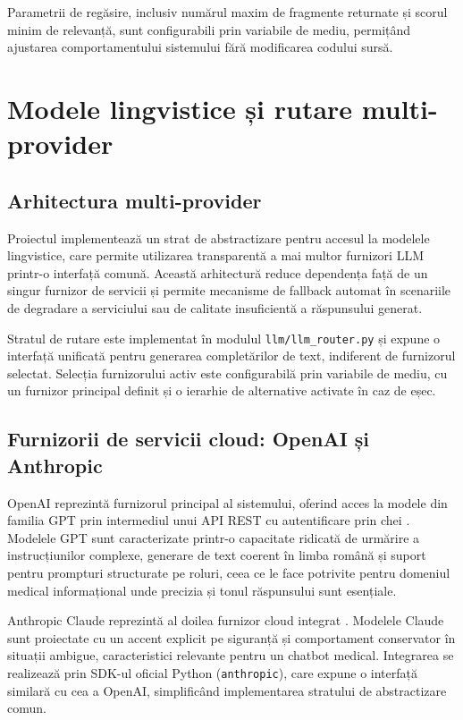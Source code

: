 \documentclass[12pt, a4paper, oneside, romanian]{teza-upb}
\begin{document}
Parametrii de regăsire, inclusiv numărul maxim de fragmente returnate și scorul minim de relevanță, sunt configurabili prin variabile de mediu, permițând ajustarea comportamentului sistemului fără modificarea codului sursă.

\section{Modele lingvistice și rutare multi-provider}

\subsection{Arhitectura multi-provider}

Proiectul implementează un strat de abstractizare pentru accesul la modelele lingvistice, care permite utilizarea transparentă a mai multor furnizori LLM printr-o interfață comună. Această arhitectură reduce dependența față de un singur furnizor de servicii și permite mecanisme de fallback automat în scenariile de degradare a serviciului sau de calitate insuficientă a răspunsului generat.

Stratul de rutare este implementat în modulul \texttt{llm/llm\_router.py} și expune o interfață unificată pentru generarea completărilor de text, indiferent de furnizorul selectat. Selecția furnizorului activ este configurabilă prin variabile de mediu, cu un furnizor principal definit și o ierarhie de alternative activate în caz de eșec.

\subsection{Furnizorii de servicii cloud: OpenAI și Anthropic}

OpenAI reprezintă furnizorul principal al sistemului, oferind acces la modele din familia GPT prin intermediul unui API REST cu autentificare prin chei \cite{openai_api}. Modelele GPT sunt caracterizate printr-o capacitate ridicată de urmărire a instrucțiunilor complexe, generare de text coerent în limba română și suport pentru prompturi structurate pe roluri, ceea ce le face potrivite pentru domeniul medical informațional unde precizia și tonul răspunsului sunt esențiale.

Anthropic Claude reprezintă al doilea furnizor cloud integrat \cite{anthropic_claude}. Modelele Claude sunt proiectate cu un accent explicit pe siguranță și comportament conservator în situații ambigue, caracteristici relevante pentru un chatbot medical. Integrarea se realizează prin SDK-ul oficial Python (\texttt{anthropic}), care expune o interfață similară cu cea a OpenAI, simplificând implementarea stratului de abstractizare comun.
\end{document}
